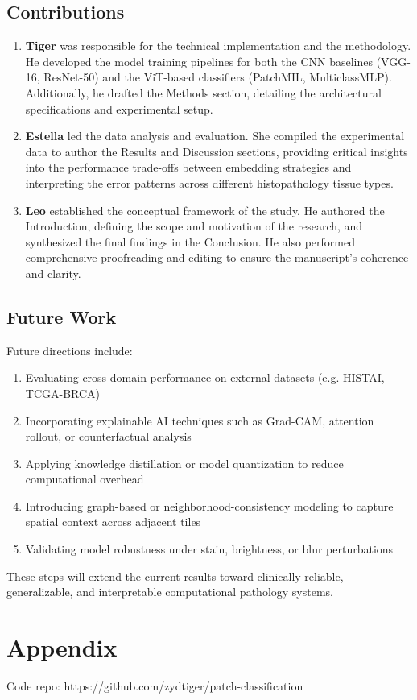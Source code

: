 \documentclass[a4paper,12pt]{article}
\begin{document}
\subsection{Contributions}
\begin{enumerate}
    \item \textbf{Tiger} was responsible for the technical implementation and the methodology. He developed the model training pipelines for both the CNN baselines (VGG-16, ResNet-50) and the ViT-based classifiers (PatchMIL, MulticlassMLP). Additionally, he drafted the Methods section, detailing the architectural specifications and experimental setup.

    \item \textbf{Estella} led the data analysis and evaluation. She compiled the experimental data to author the Results and Discussion sections, providing critical insights into the performance trade-offs between embedding strategies and interpreting the error patterns across different histopathology tissue types.

    \item \textbf{Leo} established the conceptual framework of the study. He authored the Introduction, defining the scope and motivation of the research, and synthesized the final findings in the Conclusion. He also performed comprehensive proofreading and editing to ensure the manuscript's coherence and clarity.
\end{enumerate}

\subsection{Future Work}
Future directions include:
\begin{enumerate}
    \item Evaluating cross domain performance on external datasets (e.g. HISTAI, TCGA-BRCA)
    \item Incorporating explainable AI techniques such as Grad-CAM, attention rollout, or counterfactual analysis
    \item Applying knowledge distillation or model quantization to reduce computational overhead
    \item Introducing graph-based or neighborhood-consistency modeling to capture spatial context across adjacent tiles
    \item Validating model robustness under stain, brightness, or blur perturbations
\end{enumerate}

These steps will extend the current results toward clinically reliable, generalizable, and interpretable computational pathology systems.

\label{LastPage}

\clearpage
\pagestyle{empty}
\section*{Appendix}
Code repo: https://github.com/zydtiger/patch-classification

\clearpage
\pagestyle{empty}

\begin{flushleft}
    
\end{flushleft}
\end{document}
